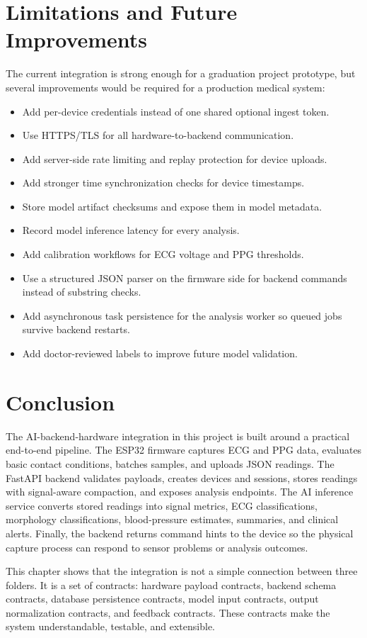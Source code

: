 \section{Limitations and Future Improvements}

The current integration is strong enough for a graduation project prototype, but several improvements would be required for a production medical system:

\begin{itemize}
    \item Add per-device credentials instead of one shared optional ingest token.
    \item Use HTTPS/TLS for all hardware-to-backend communication.
    \item Add server-side rate limiting and replay protection for device uploads.
    \item Add stronger time synchronization checks for device timestamps.
    \item Store model artifact checksums and expose them in model metadata.
    \item Record model inference latency for every analysis.
    \item Add calibration workflows for ECG voltage and PPG thresholds.
    \item Use a structured JSON parser on the firmware side for backend commands instead of substring checks.
    \item Add asynchronous task persistence for the analysis worker so queued jobs survive backend restarts.
    \item Add doctor-reviewed labels to improve future model validation.
\end{itemize}

\section{Conclusion}

The AI-backend-hardware integration in this project is built around a practical end-to-end pipeline. The ESP32 firmware captures ECG and PPG data, evaluates basic contact conditions, batches samples, and uploads JSON readings. The FastAPI backend validates payloads, creates devices and sessions, stores readings with signal-aware compaction, and exposes analysis endpoints. The AI inference service converts stored readings into signal metrics, ECG classifications, morphology classifications, blood-pressure estimates, summaries, and clinical alerts. Finally, the backend returns command hints to the device so the physical capture process can respond to sensor problems or analysis outcomes.

This chapter shows that the integration is not a simple connection between three folders. It is a set of contracts: hardware payload contracts, backend schema contracts, database persistence contracts, model input contracts, output normalization contracts, and feedback contracts. These contracts make the system understandable, testable, and extensible.
